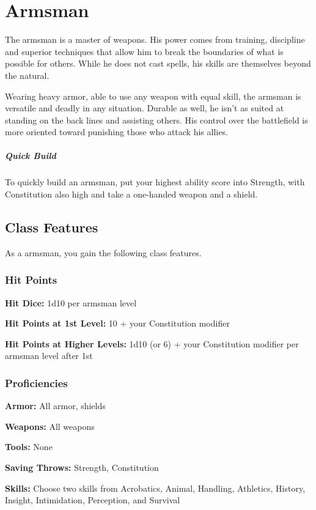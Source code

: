 \section{Armsman\label{class:armsman}}

The armsman is a master of weapons. His power comes from training, discipline and superior techniques that allow him to break the boundaries of what is possible for others. While he does not cast spells, his skills are themselves beyond the natural.

Wearing heavy armor, able to use any weapon with equal skill, the armsman is versatile and deadly in any situation. Durable as well, he isn't as suited at standing on the back lines and assisting others. His control over the battlefield is more oriented toward punishing those who attack his allies.

\subparagraph*{Quick Build}
To quickly build an armsman, put your highest ability score into Strength, with Constitution also high and take a one-handed weapon and a shield.

\subsection{Class Features}

As a armsman, you gain the following class features.

\subsubsection{Hit Points}

\textbf{Hit Dice:} 1d10 per armsman level

\textbf{Hit Points at 1st Level:} 10 + your Constitution modifier

\textbf{Hit Points at Higher Levels:} 1d10 (or 6) + your Constitution modifier per armsman level after 1st

\subsubsection{Proficiencies}

\textbf{Armor:} All armor, shields

\textbf{Weapons:} All weapons

\textbf{Tools:} None

\textbf{Saving Throws:} Strength, Constitution

\textbf{Skills:} Choose two skills from Acrobatics, Animal, Handling, Athletics, History, Insight, Intimidation, Perception, and Survival

